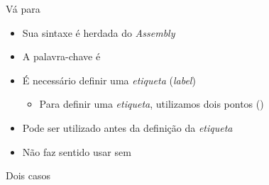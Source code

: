 \documentclass[14pt]{beamer}
\begin{document}
		\begin{frame}{Vá para}
			\begin{itemize}
				\presentationPause\item Sua sintaxe é herdada do \textit{Assembly}
				\presentationPause\item A palavra-chave é 
				\presentationPause\item É necessário definir uma \emph{etiqueta} (\textit{label})
				\begin{itemize}
					\presentationPause\item Para definir uma \emph{etiqueta}, utilizamos dois pontos (\basicCode{:})
				\end{itemize}
				\presentationPause\item Pode ser utilizado antes da definição da \emph{etiqueta}
			\end{itemize}
			\presentationPause
			\begin{itemize}
				\presentationPause\item Não faz sentido usar sem 
			\end{itemize}
		\end{frame}

		\begin{frame}{Dois casos}
			\presentationPause
			\begin{columns}
				\begin{column}{.5\textwidth}
					\only<1>{}
					\only<2>{}
				\end{column}
				\begin{column}{.5\textwidth}
					\only<1>{}
					\only<2>{}
				\end{column}
			\end{columns}
		\end{frame}
\end{document}

